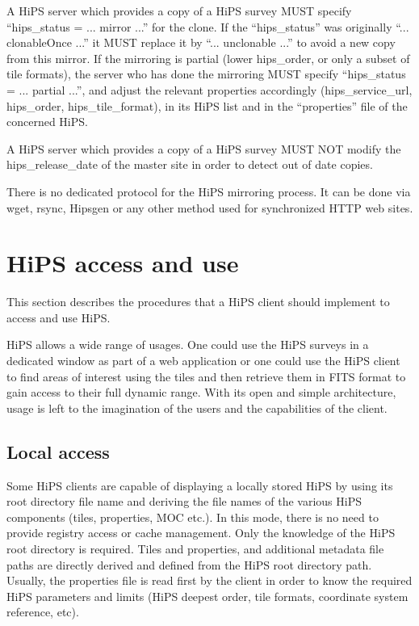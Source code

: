 \documentclass[11pt,a4paper]{ivoa}
\begin{document}
A HiPS server which provides a copy of a HiPS survey MUST specify ``hips\_status = ... mirror ...'' for the clone. If the ``hips\_status'' was originally ``... clonableOnce ...'' it MUST replace it by ``... unclonable ...'' to avoid a new copy from this mirror. If the mirroring is partial (lower hips\_order, or only a subset of tile formats), the server who has done the mirroring MUST specify ``hips\_status = ... partial ...'', and adjust the relevant properties accordingly (hips\_service\_url, hips\_order, hips\_tile\_format), in its HiPS list and in the ``properties'' file of the concerned HiPS.

A HiPS server which provides a copy of a HiPS survey MUST NOT modify the hips\_release\_date of the master site in order to detect out of date copies.

There is no dedicated protocol for the HiPS mirroring process. It can be done via wget, rsync, Hipsgen or any other method used for synchronized HTTP web sites. 

\section{HiPS access and use}
\label{sec:access}

This section describes the procedures that a HiPS client should implement to access and use HiPS.

HiPS allows a wide range of usages. One could use the HiPS surveys in a dedicated window as part of a web application or one could use the HiPS client to find areas of interest using the tiles and then retrieve them in FITS format to gain access to their full dynamic range. With its open and simple architecture, usage is left to the imagination of the users and the capabilities of the client.

\subsection{Local access}

Some HiPS clients are capable of displaying a locally stored HiPS by using its root directory file name and deriving the file names of the various HiPS components (tiles, properties, MOC etc.). In this mode, there is no need to provide registry access or cache management. Only the knowledge of the HiPS root directory is required. Tiles and properties, and additional metadata file paths are directly derived and defined from the HiPS root directory path. Usually, the properties file is read first by the client in order to know the required HiPS parameters and limits (HiPS deepest order, tile formats, coordinate system reference, etc).
\end{document}
